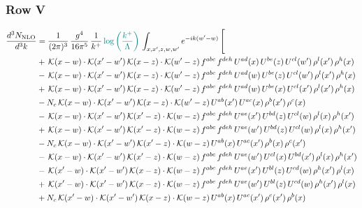 \documentclass[9pt]{article}
\numberwithin{equation}{section}
\begin{document}
\subsubsection{Row V}
\begin{align}
\frac{d^{3}N_{\mathrm{NLO}}}{d^{3}k} & = \frac{1}{(2\pi)^{3}}\,\frac{g^{4}}{16\pi^{5}}\,\frac{1}{k^{+}}\,{\color{teal}\log{\left(\frac{k^{+}}{\Lambda}\right)}}\,\int_{x,x',z,w,w'}e^{-ik(w'-w)}\,\Bigg[\notag\\ &  +\,\mathcal{K}(x-w)\cdot\mathcal{K}(x'-w')\,\mathcal{K}(x-z)\cdot\mathcal{K}(w'-z)\,f^{abc}\,f^{deh}\,U^{ad}(x)\,U^{be}(z)\,U^{cl}(w')\,\rho^{l}(x')\,\rho^{h}(x)\notag\\
& -\,\mathcal{K}(x-w)\cdot\mathcal{K}(x'-w')\,\mathcal{K}(x-z)\cdot\mathcal{K}(w'-z)\,f^{abc}\,f^{deh}\,U^{ad}(w)\,U^{be}(z)\,U^{cl}(w')\,\rho^{l}(x')\,\rho^{h}(x)\notag\\
& +\,\mathcal{K}(x-w)\cdot\mathcal{K}(x'-w')\,\mathcal{K}(x-z)\cdot\mathcal{K}(w'-z)\,f^{abc}\,f^{deh}\,U^{ad}(w)\,U^{be}(x)\,U^{cl}(x')\,\rho^{l}(x')\,\rho^{h}(x)\notag\\
& -N_{c}\,\mathcal{K}(x-w)\cdot\mathcal{K}(x'-w')\,\mathcal{K}(x-z)\cdot\mathcal{K}(w'-z)\,U^{ab}(x')\,U^{ac}(x)\,\rho^{b}(x')\,\rho^{c}(x)\notag\\
& -\,\mathcal{K}(x-w)\cdot\mathcal{K}(x'-w')\,\mathcal{K}(x'-z)\cdot\mathcal{K}(w-z)\,f^{abc}\,f^{deh}\,U^{ae}(x')\,U^{bd}(z)\,U^{cl}(w)\,\rho^{l}(x)\,\rho^{h}(x')\notag\\
& +\,\mathcal{K}(x-w)\cdot\mathcal{K}(x'-w')\,\mathcal{K}(x'-z)\cdot\mathcal{K}(w-z)\,f^{abc}\,f^{deh}\,U^{ae}(w')\,U^{bd}(z)\,U^{cl}(w)\,\rho^{l}(x)\,\rho^{h}(x')\notag\\
& -N_{c}\,\mathcal{K}(x-w)\cdot\mathcal{K}(x'-w')\,\mathcal{K}(x'-z)\cdot\mathcal{K}(w-z)\,U^{ab}(x)\,U^{ac}(x')\,\rho^{b}(x)\,\rho^{c}(x')\notag\\
& -\,\mathcal{K}(x-w)\cdot\mathcal{K}(x'-w')\,\mathcal{K}(x'-z)\cdot\mathcal{K}(w-z)\,f^{abc}\,f^{deh}\,U^{ae}(w')\,U^{cl}(x)\,U^{bd}(x')\,\rho^{l}(x)\,\rho^{h}(x')\notag\\
& -\,\mathcal{K}(x'-w)\cdot\mathcal{K}(x'-w')\,\mathcal{K}(x-z)\cdot\mathcal{K}(w-z)\,f^{abc}\,f^{deh}\,U^{ae}(x')\,U^{bl}(z)\,U^{cd}(w)\,\rho^{h}(x')\,\rho^{l}(x)\notag\\
& +\,\mathcal{K}(x'-w)\cdot\mathcal{K}(x'-w')\,\mathcal{K}(x-z)\cdot\mathcal{K}(w-z)\,f^{abc}\,f^{deh}\,U^{ae}(w')\,U^{bl}(z)\,U^{cd}(w)\,\rho^{h}(x')\,\rho^{l}(x)\notag\\
& +N_{c}\,\mathcal{K}(x'-w)\cdot\mathcal{K}(x'-w')\,\mathcal{K}(x-z)\cdot\mathcal{K}(w-z)\,U^{ab}(x)\,U^{ac}(x')\,\rho^{c}(x')\,\rho^{b}(x)\notag\\

\end{align}
\end{document}
